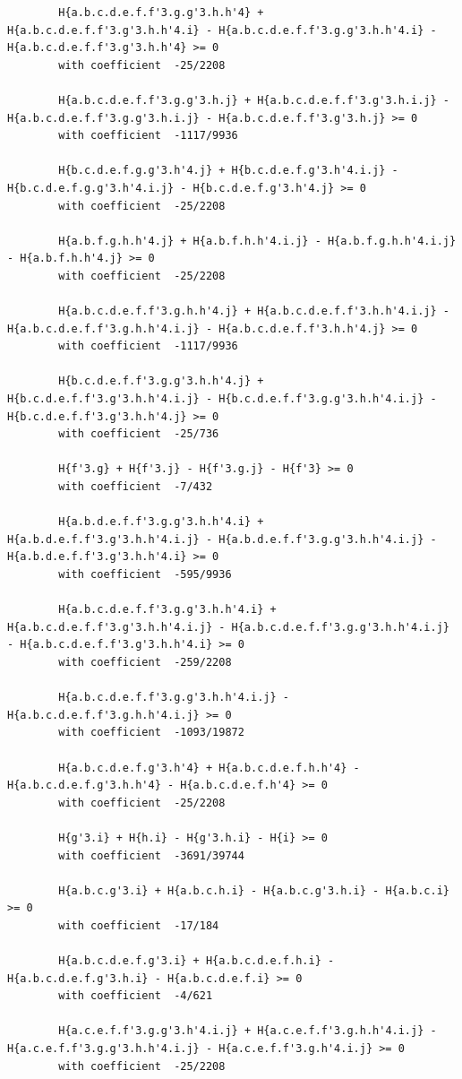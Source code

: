 \documentclass[11pt, a4paper]{kybernetika}
\begin{document}
\begin{verbatim}
		H{a.b.c.d.e.f.f'3.g.g'3.h.h'4} + H{a.b.c.d.e.f.f'3.g'3.h.h'4.i} - H{a.b.c.d.e.f.f'3.g.g'3.h.h'4.i} - H{a.b.c.d.e.f.f'3.g'3.h.h'4} >= 0
		with coefficient  -25/2208
		
		H{a.b.c.d.e.f.f'3.g.g'3.h.j} + H{a.b.c.d.e.f.f'3.g'3.h.i.j} - H{a.b.c.d.e.f.f'3.g.g'3.h.i.j} - H{a.b.c.d.e.f.f'3.g'3.h.j} >= 0
		with coefficient  -1117/9936
		
		H{b.c.d.e.f.g.g'3.h'4.j} + H{b.c.d.e.f.g'3.h'4.i.j} - H{b.c.d.e.f.g.g'3.h'4.i.j} - H{b.c.d.e.f.g'3.h'4.j} >= 0
		with coefficient  -25/2208
		
		H{a.b.f.g.h.h'4.j} + H{a.b.f.h.h'4.i.j} - H{a.b.f.g.h.h'4.i.j} - H{a.b.f.h.h'4.j} >= 0
		with coefficient  -25/2208
		
		H{a.b.c.d.e.f.f'3.g.h.h'4.j} + H{a.b.c.d.e.f.f'3.h.h'4.i.j} - H{a.b.c.d.e.f.f'3.g.h.h'4.i.j} - H{a.b.c.d.e.f.f'3.h.h'4.j} >= 0
		with coefficient  -1117/9936
		
		H{b.c.d.e.f.f'3.g.g'3.h.h'4.j} + H{b.c.d.e.f.f'3.g'3.h.h'4.i.j} - H{b.c.d.e.f.f'3.g.g'3.h.h'4.i.j} - H{b.c.d.e.f.f'3.g'3.h.h'4.j} >= 0
		with coefficient  -25/736
		
		H{f'3.g} + H{f'3.j} - H{f'3.g.j} - H{f'3} >= 0
		with coefficient  -7/432
		
		H{a.b.d.e.f.f'3.g.g'3.h.h'4.i} + H{a.b.d.e.f.f'3.g'3.h.h'4.i.j} - H{a.b.d.e.f.f'3.g.g'3.h.h'4.i.j} - H{a.b.d.e.f.f'3.g'3.h.h'4.i} >= 0
		with coefficient  -595/9936
		
		H{a.b.c.d.e.f.f'3.g.g'3.h.h'4.i} + H{a.b.c.d.e.f.f'3.g'3.h.h'4.i.j} - H{a.b.c.d.e.f.f'3.g.g'3.h.h'4.i.j} - H{a.b.c.d.e.f.f'3.g'3.h.h'4.i} >= 0
		with coefficient  -259/2208
		
		H{a.b.c.d.e.f.f'3.g.g'3.h.h'4.i.j} - H{a.b.c.d.e.f.f'3.g.h.h'4.i.j} >= 0
		with coefficient  -1093/19872
		
		H{a.b.c.d.e.f.g'3.h'4} + H{a.b.c.d.e.f.h.h'4} - H{a.b.c.d.e.f.g'3.h.h'4} - H{a.b.c.d.e.f.h'4} >= 0
		with coefficient  -25/2208
		
		H{g'3.i} + H{h.i} - H{g'3.h.i} - H{i} >= 0
		with coefficient  -3691/39744
		
		H{a.b.c.g'3.i} + H{a.b.c.h.i} - H{a.b.c.g'3.h.i} - H{a.b.c.i} >= 0
		with coefficient  -17/184
		
		H{a.b.c.d.e.f.g'3.i} + H{a.b.c.d.e.f.h.i} - H{a.b.c.d.e.f.g'3.h.i} - H{a.b.c.d.e.f.i} >= 0
		with coefficient  -4/621
		
		H{a.c.e.f.f'3.g.g'3.h'4.i.j} + H{a.c.e.f.f'3.g.h.h'4.i.j} - H{a.c.e.f.f'3.g.g'3.h.h'4.i.j} - H{a.c.e.f.f'3.g.h'4.i.j} >= 0
		with coefficient  -25/2208
		

\end{verbatim}
\end{document}
